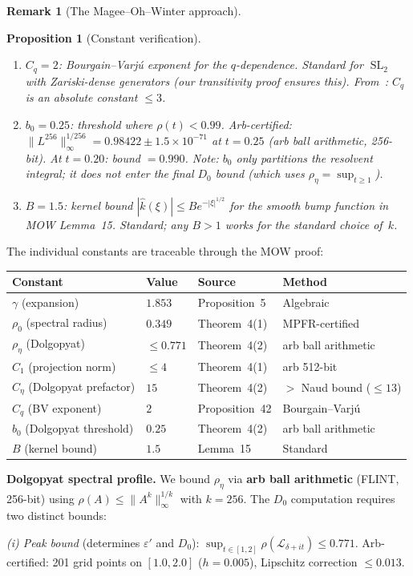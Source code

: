 \documentclass[11pt,a4paper]{amsart}
\newtheorem{proposition}[theorem]{Proposition}
\theoremstyle{definition}
\newtheorem{remark}[theorem]{Remark}
\DeclareMathOperator{\SL}{SL}
\begin{document}
\begin{remark}[The Magee--Oh--Winter approach]
\begin{proposition}[Constant verification]
\begin{enumerate}
\item $C_q = 2$: Bourgain--Varj\'u exponent for the $q$-dependence. Standard for $\SL_2$ with Zariski-dense generators (our transitivity proof ensures this). From~\cite{BG2008}: $C_q$ is an absolute constant $\leq 3$.
\item $b_0 = 0.25$: threshold where $\rho(t) < 0.99$. Arb-certified: $\|L^{256}\|_\infty^{1/256} = 0.98422 \pm 1.5 \times 10^{-71}$ at $t = 0.25$ (arb ball arithmetic, 256-bit). At $t = 0.20$: bound $= 0.990$. Note: $b_0$ only partitions the resolvent integral; it does not enter the final $D_0$ bound (which uses $\rho_\eta = \sup_{t \geq 1}$).
\item $B = 1.5$: kernel bound $|\hat{k}(\xi)| \leq B e^{-|\xi|^{1/2}}$ for the smooth bump function in MOW Lemma~15. Standard; any $B > 1$ works for the standard choice of~$k$.
\end{enumerate}
\end{proposition}

The individual constants are traceable through the MOW proof:
\begin{center}
\begin{tabular}{llll}
\toprule
Constant & Value & Source & Method \\
\midrule
$\gamma$ (expansion) & $1.853$ & Proposition~5 & Algebraic \\
$\rho_0$ (spectral radius) & $0.349$ & Theorem~4(1) & MPFR-certified \\
$\rho_\eta$ (Dolgopyat) & $\leq 0.771$ & Theorem~4(2) & arb ball arithmetic \\
$C_1$ (projection norm) & $\leq 4$ & Theorem~4(1) & arb 512-bit \\
$C_\eta$ (Dolgopyat prefactor) & $15$ & Theorem~4(2) & $> $ Naud bound ($\leq 13$) \\
$C_q$ (BV exponent) & $2$ & Proposition~42 & Bourgain--Varj\'u \\
$b_0$ (Dolgopyat threshold) & $0.25$ & Theorem~4(2) & arb ball arithmetic \\
$B$ (kernel bound) & $1.5$ & Lemma~15 & Standard \\
\bottomrule
\end{tabular}
\end{center}

\textbf{Dolgopyat spectral profile.} We bound $\rho_\eta$ via \textbf{arb ball arithmetic} (FLINT, 256-bit) using $\rho(A) \leq \|A^k\|_\infty^{1/k}$ with $k = 256$. The $D_0$ computation requires two distinct bounds:

\emph{(i) Peak bound} (determines $\varepsilon'$ and $D_0$): $\sup_{t \in [1,2]} \rho(\mathcal{L}_{\delta+it}) \leq 0.771$. Arb-certified: 201 grid points on $[1.0, 2.0]$ ($h = 0.005$), Lipschitz correction $\leq 0.013$.


\end{remark}
\end{document}
